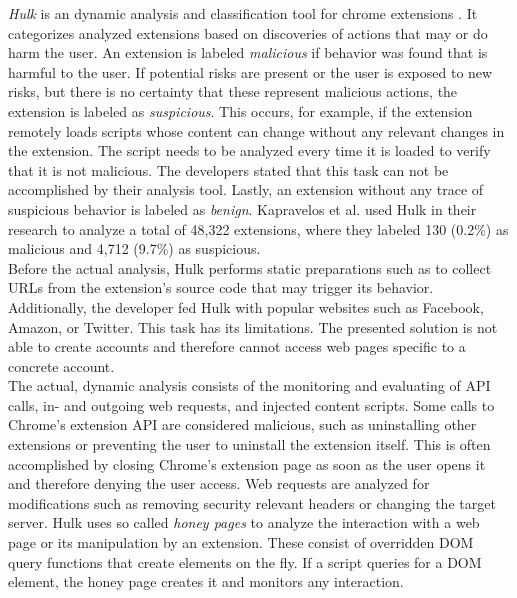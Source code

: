 	\textit{Hulk} is an dynamic analysis and classification tool for chrome extensions \cite{184485}. It categorizes analyzed extensions based on discoveries of actions that may or do harm the user. An extension is labeled \textit{malicious} if behavior was found that is harmful to the user. If potential risks are present or the user is exposed to new risks, but there is no certainty that these represent malicious actions, the extension is labeled as \textit{suspicious}. This occurs, for example, if the extension remotely loads scripts whose content can change without any relevant changes in the extension. The script needs to be analyzed every time it is loaded to verify that it is not malicious. The developers stated that this task can not be accomplished by their analysis tool. Lastly, an extension without any trace of suspicious behavior is labeled as \textit{benign}.  Kapravelos et al. used Hulk in their research to analyze a total of 48,322 extensions, where they labeled 130 (0.2\%) as malicious and 4,712 (9.7\%) as suspicious. \\
	Before the actual analysis, Hulk performs static preparations such as to collect URLs from the extension's source code that may trigger its behavior. Additionally, the developer fed Hulk with popular websites such as Facebook, Amazon, or Twitter. This task has its limitations. The presented solution is not able to create accounts and therefore cannot access web pages specific to a concrete account. \\
	The actual, dynamic analysis consists of the monitoring and evaluating of API calls, in- and outgoing web requests, and injected content scripts. Some calls to Chrome's extension API are considered malicious, such as uninstalling other extensions or preventing the user to uninstall the extension itself. This is often accomplished by closing Chrome's extension page as soon as the user opens it and therefore denying the user access. Web requests are analyzed for modifications such as removing security relevant headers or changing the target server. Hulk uses so called \textit{honey pages} to analyze the interaction with a web page or its manipulation by an extension. These consist of overridden DOM query functions that create elements on the fly. If a script queries for a DOM element, the honey page creates it and monitors any interaction. 
	
